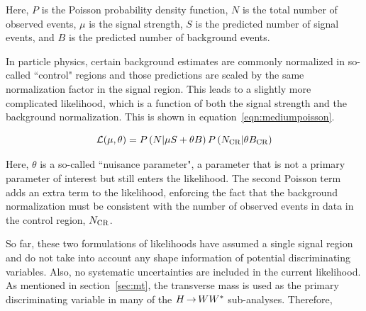 Here, $P$ is the Poisson probability density function, $N$ is the total number of observed events, $\mu$ is the signal strength, $S$ is the predicted number of signal events, and $B$ is the predicted number of background events. 

In particle physics, certain background estimates are commonly normalized in so-called ``control" regions and those predictions are scaled by the same normalization factor in the signal region. This leads to a slightly more complicated likelihood, which is a function of both the signal strength and the background normalization. This is shown in equation~\ref{eqn:mediumpoisson}.

\begin{equation}
\mathcal{L}(\mu, \theta) = P\left(N | \mu S + \theta B\right)P\left(N_{\rm CR} | \theta B_{\rm CR}\right)
\label{eqn:mediumpoisson}
\end{equation}

Here, $\theta$ is a so-called ``nuisance parameter", a parameter that is not a primary parameter of interest but still enters the likelihood. The second Poisson term adds an extra term to the likelihood, enforcing the fact that the background normalization must be consistent with the number of observed events in data in the control region, $N_{\rm CR}$.

So far, these two formulations of likelihoods have assumed a single signal region and do not take into account any shape information of potential discriminating variables. Also, no systematic uncertainties are included in the current likelihood. As mentioned in section~\ref{sec:mt}, the transverse mass is used as the primary discriminating variable in many of the $H{\,{\rightarrow}\,}WW^\ast$ sub-analyses. Therefore, 
